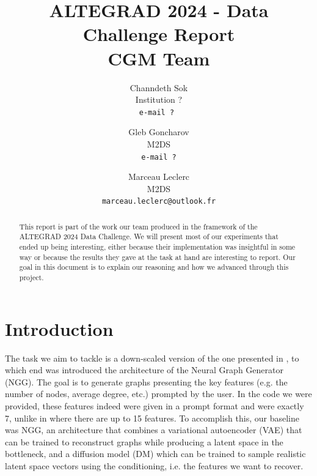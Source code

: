 \documentclass[10pt,twocolumn,letterpaper]{article}
\begin{document}
\title{ALTEGRAD 2024 - Data Challenge Report\\ CGM Team}

\author{Channdeth Sok\\
Institution ?\\
{\tt\small e-mail ? }
\and
Gleb Goncharov\\
M2DS\\
{\tt\small e-mail ?}
\and
Marceau Leclerc\\
M2DS\\
{\tt\small marceau.leclerc@outlook.fr}
}
\maketitle

\begin{abstract}
   This report is part of the work our team produced in the framework of the ALTEGRAD 2024 Data Challenge. We will present most of our experiments that ended up being interesting, either because their implementation was insightful in some way or because the results they gave at the task at hand are interesting to report. Our goal in this document is to explain our reasoning and how we advanced through this project.
\end{abstract}

\section{Introduction}
\label{sec:intro}
The task we aim to tackle is a down-scaled version of the one presented in \cite{evdaimon2024neuralgraphgeneratorfeatureconditioned}, to which end was introduced the architecture of the Neural Graph Generator (NGG). The goal is to generate graphs presenting the key features (e.g. the number of nodes, average degree, etc.) prompted by the user. In the code we were provided, these features indeed were given in a prompt format and were exactly 7, unlike in \cite{evdaimon2024neuralgraphgeneratorfeatureconditioned} where there are up to 15 features. To accomplish this, our baseline was NGG, an architecture that combines a variational autoencoder (VAE) that can be trained to reconstruct graphs while producing a latent space in the bottleneck, and a diffusion model (DM) which can be trained to sample realistic latent space vectors using the conditioning, i.e. the features we want to recover.
\medskip \newline
\end{document}
